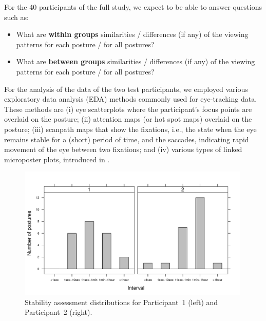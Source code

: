 \documentclass[11pt]{asaproc}
\begin{document}
For the 40 participants of the full study, we expect to be able to answer questions such as:
\begin{itemize}
\item What are {\bf within groups} similarities / differences (if any) of the viewing patterns for each posture / for all postures?
\item What are {\bf between groups} similarities / differences (if any) of the viewing patterns for each posture / for all postures?
\end{itemize}
For the analysis of the data of the two test participants, we employed various 
exploratory data analysis (EDA) methods commonly used for eye-tracking data.
These methods are (i) eye scatterplots where the participant's focus points are overlaid on the posture;
(ii) attention maps (or hot spot maps) overlaid on the posture; 
(iii) scanpath maps that show the fixations, i.e., the state when the eye remains stable for a (short) period of time, and the saccades,
indicating rapid movement of the eye between two fixations; and
(iv) various types of linked microposter plots, introduced in \cite{LS2016ASA,LS2017ASA}.


\begin{figure}[t]
\begin{center} 
\includegraphics[width=0.99\textwidth]{figures/Participant_1_2_Lengths.pdf}
\end{center} 
\caption{\label{Distributions}Stability assessment distributions for Participant~1 (left) and Participant~2 (right).}
\end{figure}
\end{document}
